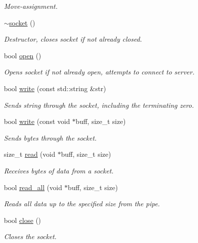 \begin{DoxyCompactItemize}
\begin{DoxyCompactList}\small\item\em Move-\/assignment. \end{DoxyCompactList}\item 
\mbox{\label{classcpen333_1_1process_1_1windows_1_1socket_a56e499069a530a1e4484e098ed39c799}} 
\hyperlink{classcpen333_1_1process_1_1windows_1_1socket_a56e499069a530a1e4484e098ed39c799}{$\sim$socket} ()
\begin{DoxyCompactList}\small\item\em Destructor, closes socket if not already closed. \end{DoxyCompactList}\item 
bool \hyperlink{classcpen333_1_1process_1_1windows_1_1socket_a6d75767fbb202435906eac08a0e63c28}{open} ()
\begin{DoxyCompactList}\small\item\em Opens socket if not already open, attempts to connect to server. \end{DoxyCompactList}\item 
bool \hyperlink{classcpen333_1_1process_1_1windows_1_1socket_add8c60c2bff8d2c4339e38e2bb92f6d7}{write} (const std\+::string \&str)
\begin{DoxyCompactList}\small\item\em Sends string through the socket, including the terminating zero. \end{DoxyCompactList}\item 
bool \hyperlink{classcpen333_1_1process_1_1windows_1_1socket_a62255247b7e8a9963e9ae5c24c6e5348}{write} (const void $\ast$buff, size\+\_\+t size)
\begin{DoxyCompactList}\small\item\em Sends bytes through the socket. \end{DoxyCompactList}\item 
size\+\_\+t \hyperlink{classcpen333_1_1process_1_1windows_1_1socket_ad6448dd6a72e2c35a2c98cb05aef38fb}{read} (void $\ast$buff, size\+\_\+t size)
\begin{DoxyCompactList}\small\item\em Receives bytes of data from a socket. \end{DoxyCompactList}\item 
bool \hyperlink{classcpen333_1_1process_1_1windows_1_1socket_a145fb57f3d1f61fd4a127e2eec89a216}{read\+\_\+all} (void $\ast$buff, size\+\_\+t size)
\begin{DoxyCompactList}\small\item\em Reads all data up to the specified size from the pipe. \end{DoxyCompactList}\item 
bool \hyperlink{classcpen333_1_1process_1_1windows_1_1socket_a27d44e55f1159dec27f5dc02f429ae8c}{close} ()
\begin{DoxyCompactList}\small\item\em Closes the socket. \end{DoxyCompactList}\end{DoxyCompactItemize}
